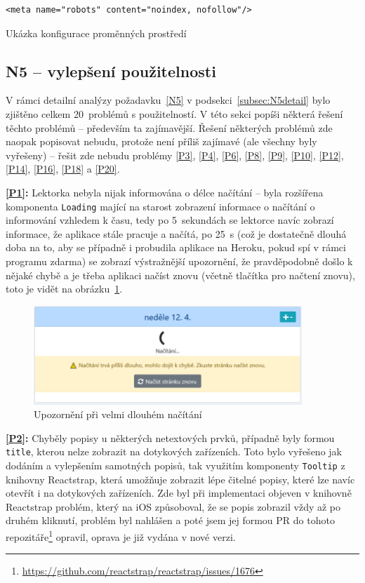 \begin{listing}[ht]
	\begin{verbatim}
<meta name="robots" content="noindex, nofollow"/>
	\end{verbatim}
	\caption{Ukázka konfigurace proměnných prostředí}\label{lst:robots}
\end{listing}

\subsection{N5 -- vylepšení použitelnosti}

V rámci detailní analýzy požadavku~\ref{N5} v podsekci~\ref{subsec:N5detail} bylo zjištěno celkem 20~problémů s použitelností. V této sekci popíši některá řešení těchto problémů -- především ta zajímavější. Řešení některých problémů zde naopak popisovat nebudu, protože není příliš zajímavé (ale všechny byly vyřešeny) -- řešit zde nebudu problémy \ref{P3}, \ref{P4}, \ref{P6}, \ref{P8}, \ref{P9}, \ref{P10}, \ref{P12}, \ref{P14}, \ref{P16}, \ref{P18} a \ref{P20}.
 
\textbf{\ref{P1}:} Lektorka nebyla nijak informována o délce načítání -- byla rozšířena komponenta \verb|Loading| mající na starost zobrazení informace o načítání o informování vzhledem k času, tedy po 5~sekundách se lektorce navíc zobrazí informace, že aplikace stále pracuje a načítá, po 25~s (což je dostatečně dlouhá doba na to, aby se případně i probudila aplikace na Heroku, pokud spí v rámci programu zdarma) se zobrazí výstražnější upozornění, že pravděpodobně došlo k nějaké chybě a je třeba aplikaci načíst znovu (včetně tlačítka pro načtení znovu), toto je vidět na obrázku~\ref{fig:ui-screen-loading}.

\begin{figure}[h]\centering
    \includegraphics[width=0.9\textwidth]{img/ui-screen-loading.png}
    \caption{Upozornění při velmi dlouhém načítání}\label{fig:ui-screen-loading}
\end{figure}

\textbf{\ref{P2}:} Chyběly popisy u některých netextových prvků, případně byly formou \verb|title|, kterou nelze zobrazit na dotykových zařízeních. Toto bylo vyřešeno jak dodáním a vylepšením samotných popisů, tak využitím komponenty \verb|Tooltip| z knihovny Reactstrap, která umožňuje zobrazit lépe čitelné popisy, které lze navíc otevřít i na dotykových zařízeních. Zde byl při implementaci objeven v knihovně Reactstrap problém, který na iOS způsoboval, že se popis zobrazil vždy až po druhém kliknutí, problém byl nahlášen a poté jsem jej formou PR do tohoto repozitáře\footnote{\url{https://github.com/reactstrap/reactstrap/issues/1676}} opravil, oprava je již vydána v nové verzi.

